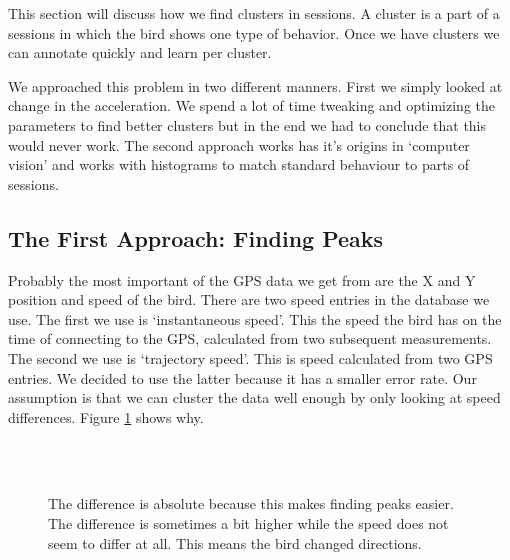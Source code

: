  This section will discuss how we find clusters in sessions. A cluster is a 
part of a sessions in which the bird shows one type of behavior. Once we have
clusters we can annotate quickly and learn per cluster.

We approached this problem in two different manners. First we simply looked at
change in the acceleration. We spend a lot of time tweaking and optimizing the parameters
to find better clusters but in the end we had to conclude that this would never work. 
The second
approach works has it's origins in `computer vision' and works with histograms to 
match standard behaviour to parts of sessions.

\subsection{The First Approach: Finding Peaks}
 Probably the most important of the GPS data we get from \bits are the X and Y
 position and speed of the bird. There are two speed entries in the database we
 use. The first we use is `instantaneous speed'.    
This the speed the bird has on the time of
 connecting to the GPS, calculated from two subsequent measurements. The second
we use is 
 `trajectory speed'. This is speed calculated from two GPS entries. 
We decided to use the latter because it has a smaller error rate. 
 Our assumption is that we can cluster the data well 
 enough by only looking at speed differences. Figure \ref{fig:speed} shows
 why.

\begin{figure}
  \centering
   \\
   \\
  \caption{The difference is absolute because this makes finding peaks easier. The difference is sometimes a bit higher while the speed does not seem to differ at all. This means the bird changed directions.}
  \label{fig:speed}
\end{figure}

